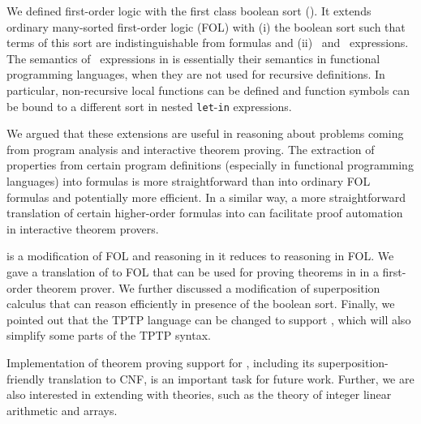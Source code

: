 We defined first-order logic with the first class boolean sort (\folb{}). It extends ordinary many-sorted first-order logic (FOL) with (i) the boolean sort such that terms of this sort are indistinguishable from formulas and (ii) \ITE\ and \LETIN\ expressions. The semantics of \LETIN\ expressions in \folb{} is essentially their semantics in functional programming languages, when they are not used for recursive definitions. In particular, non-recursive local functions can be defined and function symbols can be bound to a different sort in nested \verb'let'-\verb'in' expressions.

We argued that these extensions are useful in reasoning about problems coming from program analysis and interactive theorem proving. The extraction of properties from certain program definitions (especially in functional programming languages) into \folb{} formulas is more straightforward than into ordinary FOL formulas and potentially more efficient. In a similar way, a more straightforward translation of certain higher-order formulas into \folb{} can facilitate proof automation in interactive theorem provers.

\folb{} is a modification of FOL and reasoning in it reduces to reasoning in FOL. We gave a translation of \folb{} to FOL that can be used for proving theorems in \folb{} in a first-order theorem prover. We further discussed a modification of superposition calculus that can reason efficiently in presence of the boolean sort. Finally, we pointed out that the TPTP language can be changed to support \folb{}, which will also simplify some parts of the TPTP syntax.

Implementation of theorem proving support for \folb{}, including its super\-po\-sition-friendly translation to CNF, is an important task for future work. Further, we are also interested in extending \folb{} with theories, such as the theory of integer linear arithmetic and arrays.